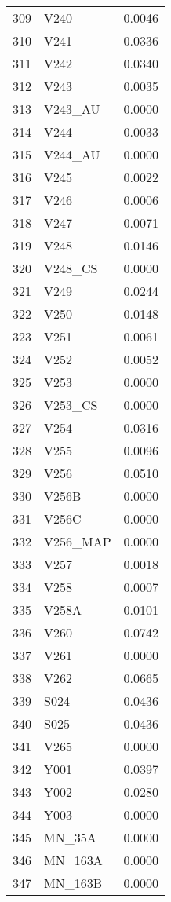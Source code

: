 \documentclass{amsart}
\begin{document}
\begin{longtable}{rlr}
  309 & V240 & 0.0046 \\ 
  310 & V241 & 0.0336 \\ 
  311 & V242 & 0.0340 \\ 
  312 & V243 & 0.0035 \\ 
  313 & V243\_AU & 0.0000 \\ 
  314 & V244 & 0.0033 \\ 
  315 & V244\_AU & 0.0000 \\ 
  316 & V245 & 0.0022 \\ 
  317 & V246 & 0.0006 \\ 
  318 & V247 & 0.0071 \\ 
  319 & V248 & 0.0146 \\ 
  320 & V248\_CS & 0.0000 \\ 
  321 & V249 & 0.0244 \\ 
  322 & V250 & 0.0148 \\ 
  323 & V251 & 0.0061 \\ 
  324 & V252 & 0.0052 \\ 
  325 & V253 & 0.0000 \\ 
  326 & V253\_CS & 0.0000 \\ 
  327 & V254 & 0.0316 \\ 
  328 & V255 & 0.0096 \\ 
  329 & V256 & 0.0510 \\ 
  330 & V256B & 0.0000 \\ 
  331 & V256C & 0.0000 \\ 
  332 & V256\_MAP & 0.0000 \\ 
  333 & V257 & 0.0018 \\ 
  334 & V258 & 0.0007 \\ 
  335 & V258A & 0.0101 \\ 
  336 & V260 & 0.0742 \\ 
  337 & V261 & 0.0000 \\ 
  338 & V262 & 0.0665 \\ 
  339 & S024 & 0.0436 \\ 
  340 & S025 & 0.0436 \\ 
  341 & V265 & 0.0000 \\ 
  342 & Y001 & 0.0397 \\ 
  343 & Y002 & 0.0280 \\ 
  344 & Y003 & 0.0000 \\ 
  345 & MN\_35A & 0.0000 \\ 
  346 & MN\_163A & 0.0000 \\ 
  347 & MN\_163B & 0.0000 \\ 

\end{longtable}
\end{document}
